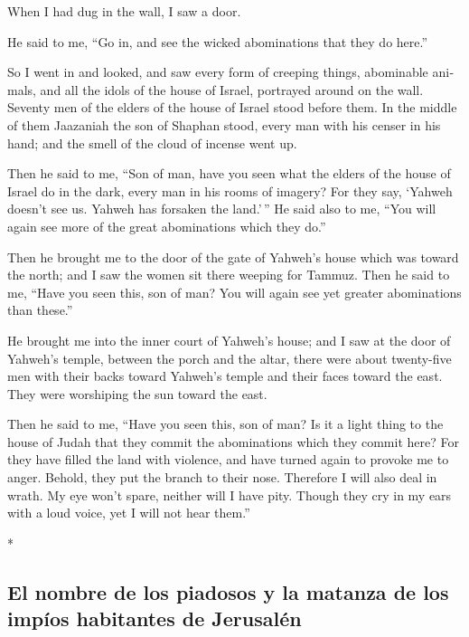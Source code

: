\begin{paracol}{2}
\begin{otherlanguage}{english}
When I had dug in the wall, I saw a door.

 He said to me, ``Go in, and see the wicked abominations
that they do here.''

 So I went in and looked, and saw every form of creeping
things, abominable animals, and all the idols of the house of Israel,
portrayed around on the wall.  Seventy men of the elders
of the house of Israel stood before them. In the middle of them
Jaazaniah the son of Shaphan stood, every man with his censer in his
hand; and the smell of the cloud of incense went up.

 Then he said to me, ``Son of man, have you seen what the
elders of the house of Israel do in the dark, every man in his rooms of
imagery? For they say, `Yahweh doesn't see us. Yahweh has forsaken the
land.'\,''  He said also to me, ``You will again see more
of the great abominations which they do.''

 Then he brought me to the door of the gate of Yahweh's
house which was toward the north; and I saw the women sit there weeping
for Tammuz.  Then he said to me, ``Have you seen this,
son of man? You will again see yet greater abominations than these.''

 He brought me into the inner court of Yahweh's house;
and I saw at the door of Yahweh's temple, between the porch and the
altar, there were about twenty-five men with their backs toward Yahweh's
temple and their faces toward the east. They were worshiping the sun
toward the east.

 Then he said to me, ``Have you seen this, son of man? Is
it a light thing to the house of Judah that they commit the abominations
which they commit here? For they have filled the land with violence, and
have turned again to provoke me to anger. Behold, they put the branch to
their nose.  Therefore I will also deal in wrath. My eye
won't spare, neither will I have pity. Though they cry in my ears with a
loud voice, yet I will not hear them.''

\end{otherlanguage}

\switchcolumn[0]*

\hypertarget{el-nombre-de-los-piadosos-y-la-matanza-de-los-impuxedos-habitantes-de-jerusaluxe9n}{%
\subsection{El nombre de los piadosos y la matanza de los impíos
habitantes de
Jerusalén}\label{el-nombre-de-los-piadosos-y-la-matanza-de-los-impuxedos-habitantes-de-jerusaluxe9n}}


\end{paracol}
